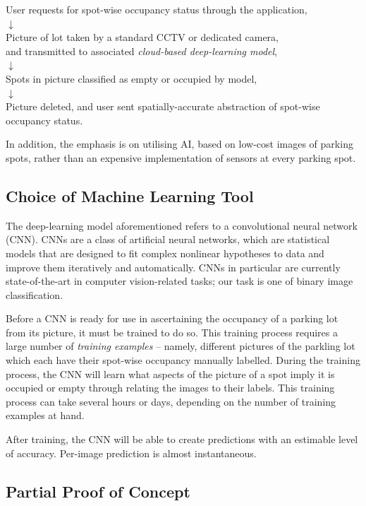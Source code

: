 \documentclass[]{article}
\begin{document}
\begin{center}
User requests for spot-wise occupancy status through the application, \\
$\downarrow$ \\
Picture of lot taken by a standard CCTV or dedicated camera, \\
and transmitted to associated {\it cloud-based deep-learning model}, \\
$\downarrow$ \\
Spots in picture classified as empty or occupied by model, \\
$\downarrow$ \\
Picture deleted, and user sent spatially-accurate abstraction of spot-wise
occupancy status.
\end{center}

In addition, the emphasis is on utilising AI, based on low-cost images of
parking spots, rather than an expensive implementation of sensors at every
parking spot.

\subsection{Choice of Machine Learning
Tool}\label{choice-of-machine-learning-tool}

The deep-learning model aforementioned refers to a convolutional neural
network (CNN). CNNs are a class of artificial neural networks, which are
statistical models that are designed to fit complex nonlinear hypotheses
to data and improve them iteratively and automatically. CNNs in
particular are currently state-of-the-art in computer vision-related
tasks; our task is one of binary image classification.

Before a CNN is ready for use in ascertaining the occupancy of a parking
lot from its picture, it must be trained to do so. This training process
requires a large number of \emph{training examples} -- namely, different
pictures of the parkling lot which each have their spot-wise occupancy
manually labelled. During the training process, the CNN will learn what
aspects of the picture of a spot imply it is occupied or empty through
relating the images to their labels. This training process can take
several hours or days, depending on the number of training examples at
hand.

After training, the CNN will be able to create predictions with an
estimable level of accuracy. Per-image prediction is almost
instantaneous.

\subsection{Partial Proof of Concept}\label{partial-proof-of-concept}
\end{document}
